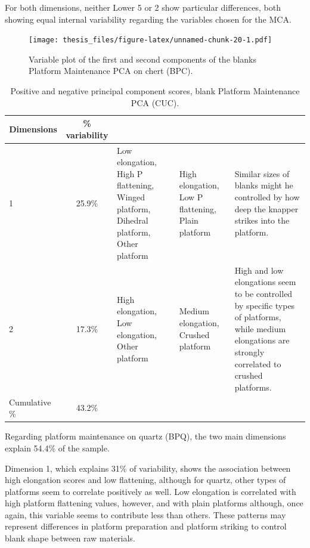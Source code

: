 \documentclass[12pt,twoside]{reedthesis}
\begin{document}
For both dimensions, neither Lower 5 or 2 show particular differences, both showing equal internal variability regarding the variables chosen for the MCA.
\begin{figure}
\centering
\texttt{[image: thesis\_files/figure-latex/unnamed-chunk-20-1.pdf]}
\caption{\label{fig:unnamed-chunk-20}Variable plot of the first and second components of the blanks Platform Maintenance PCA on chert (BPC).}
\end{figure}
\begin{table}[!h]

\caption{\label{tab:unnamed-chunk-21}Positive and negative principal component scores, blank Platform Maintenance PCA (CUC).}
\centering
\begin{tabular}[t]{lc>{\raggedright\arraybackslash}p{3cm}>{\raggedright\arraybackslash}p{3cm}>{\raggedright\arraybackslash}p{3cm}}
\toprule
\multicolumn{1}{c}{\textbf{Dimensions}} & \multicolumn{1}{c}{\textbf{\% variability}} & \multicolumn{1}{>{\centering\arraybackslash}p{3cm}}{\textbf{+}} & \multicolumn{1}{>{\centering\arraybackslash}p{3cm}}{\textbf{-}} & \multicolumn{1}{>{\centering\arraybackslash}p{3cm}}{\textbf{Interpretation}}\\
\midrule
1 & 25.9\% & Low elongation, High P flattening, Winged platform, Dihedral platform, Other platform & High elongation, Low P flattening, Plain platform & Similar sizes of blanks might he controlled by how deep the knapper strikes into the platform.\\
2 & 17.3\% & High elongation, Low elongation, Other platform & Medium elongation, Crushed platform & High and low elongations seem to be controlled by specific types of platforms, while medium elongations are strongly correlated to crushed platforms.\\
Cumulative \% & 43.2\% &  &  & \\
\bottomrule
\end{tabular}
\end{table}
Regarding platform maintenance on quartz (BPQ), the two main dimensions explain 54.4\% of the sample.

Dimension 1, which explains 31\% of variability, shows the association between high elongation scores and low flattening, although for quartz, other types of platforms seem to correlate positively as well. Low elongation is correlated with high platform flattening values, however, and with plain platforms although, once again, this variable seems to contribute less than others. These patterns may represent differences in platform preparation and platform striking to control blank shape between raw materials.
\end{document}
